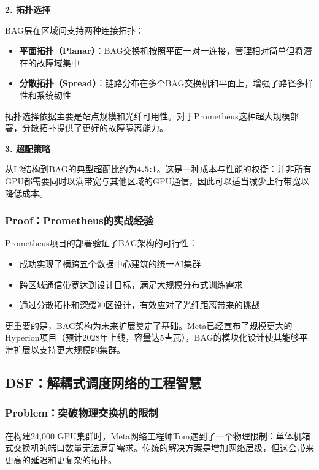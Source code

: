 \textbf{2. 拓扑选择}

BAG层在区域间支持两种连接拓扑：

\begin{itemize}
    \item \textbf{平面拓扑（Planar）}：BAG交换机按照平面一对一连接，管理相对简单但将潜在的故障域集中
    \item \textbf{分散拓扑（Spread）}：链路分布在多个BAG交换机和平面上，增强了路径多样性和系统韧性
\end{itemize}

拓扑选择依据主要是站点规模和光纤可用性。对于Prometheus这种超大规模部署，分散拓扑提供了更好的故障隔离能力。

\textbf{3. 超配策略}

从L2结构到BAG的典型超配比约为\textbf{4.5:1}。这是一种成本与性能的权衡：并非所有GPU都需要同时以满带宽与其他区域的GPU通信，因此可以适当减少上行带宽以降低成本。

\subsubsection{Proof：Prometheus的实战经验}

Prometheus项目的部署验证了BAG架构的可行性：

\begin{itemize}
    \item 成功实现了横跨五个数据中心建筑的统一AI集群
    \item 跨区域通信带宽达到设计目标，满足大规模分布式训练需求
    \item 通过分散拓扑和深缓冲区设计，有效应对了光纤距离带来的挑战
\end{itemize}

更重要的是，BAG架构为未来扩展奠定了基础。Meta已经宣布了规模更大的Hyperion项目（预计2028年上线，容量达5吉瓦），BAG的模块化设计使其能够平滑扩展以支持更大规模的集群。

\subsection{DSF：解耦式调度网络的工程智慧}

\subsubsection{Problem：突破物理交换机的限制}

在构建24,000 GPU集群时，Meta网络工程师Tom遇到了一个物理限制：单体机箱式交换机的端口数量无法满足需求。传统的解决方案是增加网络层级，但这会带来更高的延迟和更复杂的拓扑。

